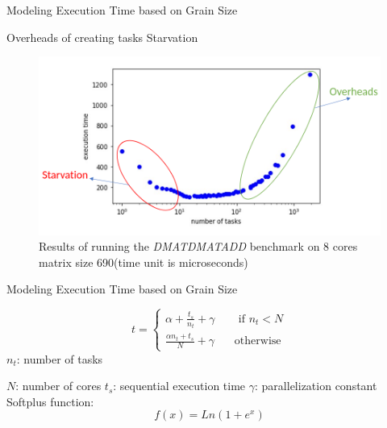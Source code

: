 \documentclass[10pt]{beamer}
\begin{document}
\begin{frame}{Modeling Execution Time based on Grain Size}
	\begin{outline}		
		\1Overheads of creating tasks
		\1Starvation
		\begin{figure}
			\includegraphics[width=0.9\linewidth]{images/true_1_annotated.png}	
			\caption{Results of running the \textit{DMATDMATADD} benchmark on 8 cores matrix size 690(time unit is microseconds)}	
		\end{figure}
	\end{outline}
\end{frame}

\begin{frame}{Modeling Execution Time based on Grain Size}
\begin{outline}		
	$$t=\left\{
	\begin{aligned}
		\alpha+\frac{t_s}{n_t}+\gamma  \:\:\:\:\:\:\:\:      \text{ if } n_t<N\\
		\frac{\alpha{n_t}+t_s}{N}+\gamma\:\:\:\:\:\:\:\:     \text{otherwise}
	\end{aligned}
	\right.$$
	$n_t$: number of tasks
	
	$N$: number of cores
	$t_s$: sequential execution time
	$\gamma$: parallelization constant
	Softplus function:
	$$f(x)=Ln(1+e^x)$$
\end{outline}
\end{frame}
\end{document}
